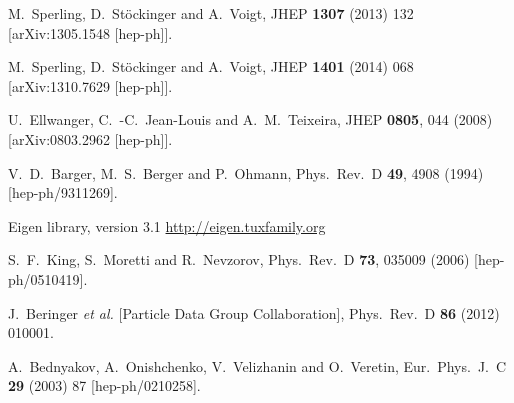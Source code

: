 \documentclass[final,3p,times,pdflatex]{elsarticle}
\begin{document}
\begin{thebibliography}{100}
  M.~Sperling, D.~Stöckinger and A.~Voigt,
  JHEP {\bf 1307} (2013) 132
  [arXiv:1305.1548 [hep-ph]].

  M.~Sperling, D.~Stöckinger and A.~Voigt,
  JHEP {\bf 1401} (2014) 068
  [arXiv:1310.7629 [hep-ph]].

  U.~Ellwanger, C.~-C.~Jean-Louis and A.~M.~Teixeira,
  JHEP {\bf 0805}, 044 (2008)
  [arXiv:0803.2962 [hep-ph]].


  V.~D.~Barger, M.~S.~Berger and P.~Ohmann,
  Phys.\ Rev.\ D {\bf 49}, 4908 (1994)
  [hep-ph/9311269].

Eigen library, version 3.1 \url{http://eigen.tuxfamily.org}

  S.~F.~King, S.~Moretti and R.~Nevzorov,
  Phys.\ Rev.\ D {\bf 73}, 035009 (2006)
  [hep-ph/0510419].

  J.~Beringer {\it et al.}  [Particle Data Group Collaboration],
  Phys.\ Rev.\ D {\bf 86} (2012) 010001.

  A.~Bednyakov, A.~Onishchenko, V.~Velizhanin and O.~Veretin,
  Eur.\ Phys.\ J.\ C {\bf 29} (2003) 87
  [hep-ph/0210258].


\end{thebibliography}
\end{document}
